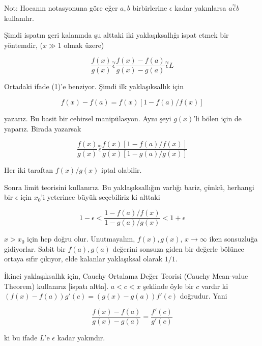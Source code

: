 \documentclass[12pt,fleqn]{article}\usepackage{../../common}
\begin{document}
Not: Hocanın notasyonuna göre eğer $a,b$ birbirlerine $\epsilon$ kadar
yakınlarsa $a \stackrel{\approx}{\epsilon} b$ kullanılır.

Şimdi ispatın geri kalanında şu alttaki iki yaklaşıksallığı ispat
etmek bir yöntemdir, ($x\gg 1$ olmak üzere)

$$ 
\frac{f(x)}{g(x)} \stackrel{\approx}{\epsilon}
\frac{f(x)-f(a)}{g(x)-g(a)} \stackrel{\approx}{\epsilon}
L
 $$

Ortadaki ifade (1)'e benziyor. Şimdi ilk yaklaşıksallık için 

$$ f(x) - f(a) = f(x) [ 1 - f(a)/f(x)]  $$

yazarız. Bu basit bir cebirsel manipülasyon. Aynı şeyi $g(x)$'li bölen için
de yaparız. Birada yazarsak

$$ \frac{f(x)}{g(x)} \stackrel{\approx}{\epsilon}
\frac{f(x) [ 1 - f(a)/f(x)] }{g(x) [ 1 - g(a)/g(x)] } 
$$

Her iki taraftan $f(x)/g(x)$ iptal olabilir. 

Sonra limit teorisini kullanırız. Bu yaklaşıksallığın varlığı bariz, çünkü,
herhangi bir $\epsilon$ için $x_0$'i yeterince büyük seçebiliriz ki alttaki

$$ 1 - \epsilon < \frac{1 -  f(a)/f(x)}{1-g(a)/g(x)} < 1 + \epsilon $$

$x > x_0$ için hep doğru olur. Unutmayalım, $f(x),g(x)$, $x\to \infty$ iken
sonsuzluğa gidiyorlar. Sabit bir $f(a),g(a)$ değerini sonsuza giden bir
değerle bölünce ortaya sıfır çıkıyor, elde kalanlar yaklaşıksal olarak $1/1$. 

İkinci yaklaşıksallık için, Cauchy Ortalama Değer Teorisi (Cauchy
Mean-value Theorem) kullanırız [ispatı altta].  $a < c < x$ şeklinde öyle
bir $c$ vardır ki $(f(x) - f(a))g'(c) = (g(x)-g(a))f'(c)$ doğrudur. Yani

$$ \frac{f(x)-f(a)}{g(x)-g(a)} = \frac{f'(c)}{g'(c)} $$

ki bu ifade $L$'e  $\epsilon$ kadar yakındır.
\end{document}
